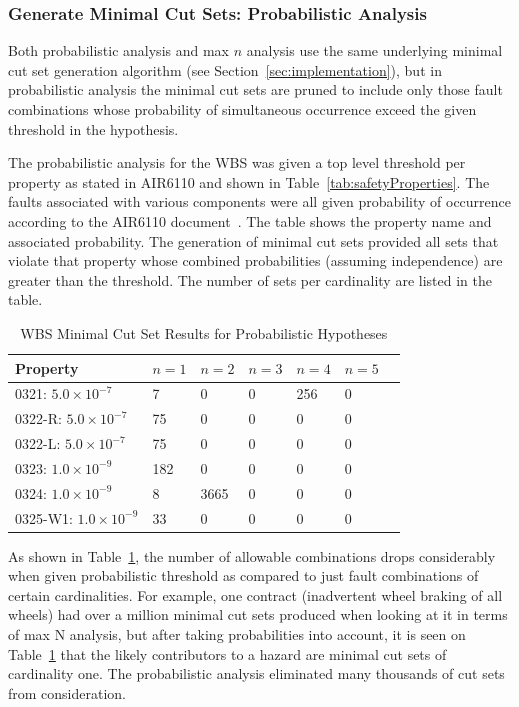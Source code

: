 \subsubsection{Generate Minimal Cut Sets: Probabilistic Analysis}
\label{sec:prob_generate}
Both probabilistic analysis and max $n$ analysis use the same underlying minimal cut set generation algorithm (see Section~\ref{sec:implementation}), but in probabilistic analysis the minimal cut sets are pruned to include only those fault combinations whose probability of simultaneous occurrence exceed the given threshold in the hypothesis. 

The probabilistic analysis for the WBS was given a top level threshold per property as stated in AIR6110 and shown in Table~\ref{tab:safetyProperties}. The faults associated with various components were all given probability of occurrence according to the AIR6110 document~\cite{AIR6110}. The table shows the property name and associated probability. The generation of minimal cut sets provided all sets that violate that property whose combined probabilities (assuming independence) are greater than the threshold. The number of sets per cardinality are listed in the table. 

\begin{table}[htbp]
\begin{center}
\caption{WBS Minimal Cut Set Results for Probabilistic Hypotheses}
    \begin{tabular}{ | l | l | l | l | l | l | l | }
    \hline
    \textbf{Property} & $n=1$ & $n=2$ & $n=3$ & $n=4$ 
		& $n=5$    \\ \hline \hline
    0321: $5.0 \times 10^{-7}$ & 7 & 0 & 0 & 256 & 0   \\ \hline
    0322-R: $5.0 \times 10^{-7}$ & 75 & 0 & 0 &0 &0   \\ \hline
    0322-L: $5.0 \times 10^{-7}$ & 75 & 0 & 0 & 0 & 0    \\ \hline
    0323: $1.0 \times 10^{-9}$ & 182 & 0 & 0 & 0 & 0    \\ \hline
    0324: $1.0 \times 10^{-9}$ & 8 & 3665 & 0 & 0 & 0   \\ \hline
    0325-W1: $1.0 \times 10^{-9}$ & 33 & 0 & 0 &0 &0    \\ \hline
    \end{tabular}
    \label{tab:wbs_prob_results}
    \end{center}
\end{table}

As shown in Table~\ref{tab:wbs_prob_results}, the number of allowable combinations drops considerably when given probabilistic threshold as compared to just fault combinations of certain cardinalities. For example, one contract (inadvertent wheel braking of all wheels) had over a million minimal cut sets produced when looking at it in terms of max N analysis, but after taking probabilities into account, it is seen on Table~\ref{tab:wbs_prob_results} that the likely contributors to a hazard are minimal cut sets of cardinality one. The probabilistic analysis eliminated many thousands of cut sets from consideration.

